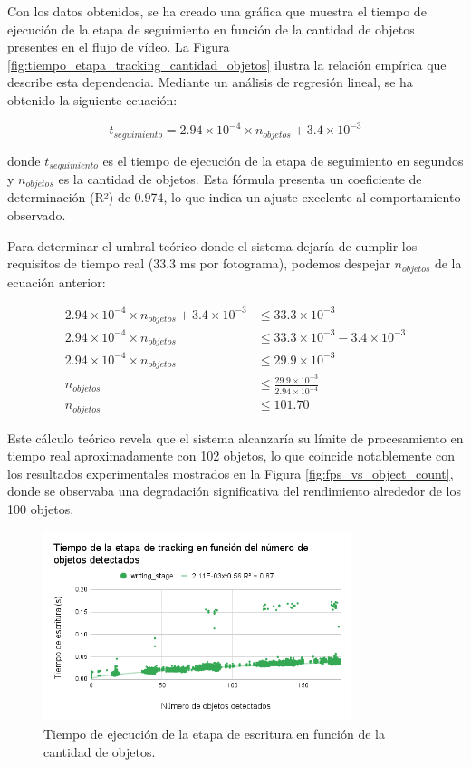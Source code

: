 \documentclass[11pt,spanish,listoffigures,listoftables]{tfgetsinf}
\begin{document}
Con los datos obtenidos, se ha creado una gráfica que muestra el tiempo de ejecución de la etapa de seguimiento en función de la cantidad de objetos presentes en el flujo de vídeo. La Figura \ref{fig:tiempo_etapa_tracking_cantidad_objetos} ilustra la relación empírica que describe esta dependencia. Mediante un análisis de regresión lineal, se ha obtenido la siguiente ecuación:

\begin{equation}
t_{seguimiento} = 2.94 \times 10^{-4} \times n_{objetos} + 3.4 \times 10^{-3}
\end{equation}

donde $t_{seguimiento}$ es el tiempo de ejecución de la etapa de seguimiento en segundos y $n_{objetos}$ es la cantidad de objetos. Esta fórmula presenta un coeficiente de determinación (R²) de 0.974, lo que indica un ajuste excelente al comportamiento observado.

Para determinar el umbral teórico donde el sistema dejaría de cumplir los requisitos de tiempo real (33.3 ms por fotograma), podemos despejar $n_{objetos}$ de la ecuación anterior:

\begin{align}
   2.94 \times 10^{-4} \times n_{objetos} + 3.4 \times 10^{-3} &\leq 33.3 \times 10^{-3} \\
   2.94 \times 10^{-4} \times n_{objetos} &\leq 33.3 \times 10^{-3} - 3.4 \times 10^{-3} \\
   2.94 \times 10^{-4} \times n_{objetos} &\leq 29.9 \times 10^{-3} \\
   n_{objetos} &\leq \frac{29.9 \times 10^{-3}}{2.94 \times 10^{-4}} \\
   n_{objetos} &\leq 101.70
\end{align}

Este cálculo teórico revela que el sistema alcanzaría su límite de procesamiento en tiempo real aproximadamente con 102 objetos, lo que coincide notablemente con los resultados experimentales mostrados en la Figura \ref{fig:fps_vs_object_count}, donde se observaba una degradación significativa del rendimiento alrededor de los 100 objetos.

\begin{figure}[H]
   \centering
   \includegraphics[width=0.8\textwidth]{images/analisis_de_la_solucion/cantidad_objetos/tiempo_etapa_escritura_cantidad_objetos.png}
   \caption{Tiempo de ejecución de la etapa de escritura en función de la cantidad de objetos.}
   \label{fig:tiempo_etapa_escritura_cantidad_objetos}
\end{figure}
\end{document}
